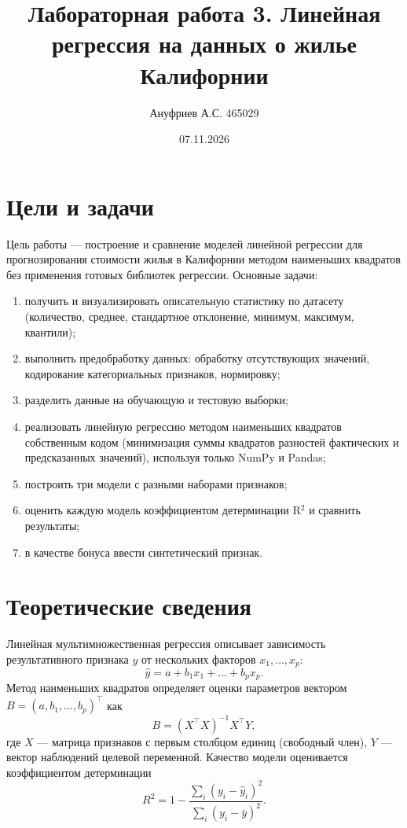 \documentclass[12pt,a4paper]{article}
\title{Лабораторная работа 3. Линейная регрессия на данных о жилье Калифорнии}
\author{Ануфриев А.С. 465029}
\date{07.11.2026}
\begin{document}
\maketitle

\section{Цели и задачи}
Цель работы --- построение и сравнение моделей линейной регрессии для прогнозирования стоимости жилья в Калифорнии методом наименьших квадратов без применения готовых библиотек регрессии. Основные задачи:
\begin{enumerate}
\item получить и визуализировать описательную статистику по датасету (количество, среднее, стандартное отклонение, минимум, максимум, квантили);
\item выполнить предобработку данных: обработку отсутствующих значений, кодирование категориальных признаков, нормировку;
\item разделить данные на обучающую и тестовую выборки;
\item реализовать линейную регрессию методом наименьших квадратов собственным кодом (минимизация суммы квадратов разностей фактических и предсказанных значений), используя только NumPy и Pandas;
\item построить три модели с разными наборами признаков;
\item оценить каждую модель коэффициентом детерминации R$^2$ и сравнить результаты;
\item в качестве бонуса ввести синтетический признак.
\end{enumerate}

\section{Теоретические сведения}
Линейная мультимножественная регрессия описывает зависимость результативного признака $y$ от нескольких факторов $x_1,\dots,x_p$:
\begin{equation}
\hat{y} = a + b_1 x_1 + \dots + b_p x_p .
\end{equation}
Метод наименьших квадратов определяет оценки параметров вектором $B = (a,b_1,\dots,b_p)^\top$ как
\begin{equation}
B = (X^\top X)^{-1} X^\top Y ,
\end{equation}
где $X$ --- матрица признаков с первым столбцом единиц (свободный член), $Y$ --- вектор наблюдений целевой переменной. Качество модели оценивается коэффициентом детерминации
\begin{equation}
R^2 = 1 - \frac{\sum_i (y_i - \hat{y}_i)^2}{\sum_i (y_i - \bar{y})^2} .
\end{equation}
\end{document}
